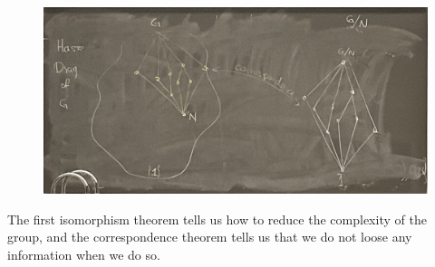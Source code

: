 \begin{figure}[ht!]
    \centering

    \includegraphics[width=0.67\linewidth]{figures/correspondence-theorem.png}
\end{figure}

The first isomorphism theorem tells us how to reduce the complexity of the group, and the correspondence theorem tells us that we do not loose any information when we do so.